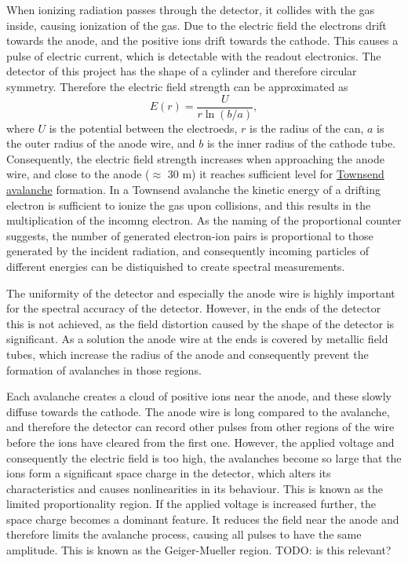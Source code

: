 \documentclass[a4paper]{article}
\begin{document}
When ionizing radiation passes through the detector, it collides with the gas inside, causing ionization of the gas.
Due to the electric field the electrons drift towards the anode, and the positive ions drift towards the cathode.
This causes a pulse of electric current, which is detectable with the readout electronics.
The detector of this project has the shape of a cylinder and therefore circular symmetry.
Therefore the electric field strength can be approximated as
\begin{equation}
E(r) = \frac{U}{r \ln(b/a) },
\end{equation}
where $U$ is the potential between the electroeds, $r$ is the radius of the can, $a$ is the outer radius of the anode wire, and $b$ is the inner radius of the cathode tube.
Consequently, the electric field strength increases when approaching the anode wire, and close to the anode ($\approx$ 30 \textmu m) it reaches sufficient level for
\href{https://en.wikipedia.org/wiki/Townsend_discharge}{Townsend avalanche} formation.
In a Townsend avalanche the kinetic energy of a drifting electron is sufficient to ionize the gas upon collisions, and this results in the multiplication of the incomng electron.
As the naming of the proportional counter suggests, the number of generated electron-ion pairs is proportional to those generated by the incident radiation, and consequently incoming particles of different energies can be distiquished to create spectral measurements.
\cites{winkler_gaseous_2015}[p. 159--164]{knoll_radiation_2010}

The uniformity of the detector and especially the anode wire is highly important for the spectral accuracy of the detector.
However, in the ends of the detector this is not achieved, as the field distortion caused by the shape of the detector is significant.
As a solution the anode wire at the ends is covered by metallic field tubes, which increase the radius of the anode and consequently prevent the formation of avalanches in those regions.
\cite[p. 165]{knoll_radiation_2010}

Each avalanche creates a cloud of positive ions near the anode, and these slowly diffuse towards the cathode.
The anode wire is long compared to the avalanche, and therefore the detector can record other pulses from other regions of the wire before the ions have cleared from the first one.
However, the applied voltage and consequently the electric field is too high, the avalanches become so large that the ions form a significant space charge in the detector, which alters its characteristics and causes nonlinearities in its behaviour.
This is known as the limited proportionality region.
If the applied voltage is increased further, the space charge becomes a dominant feature.
It reduces the field near the anode and therefore limits the avalanche process, causing all pulses to have the same amplitude.
This is known as the Geiger-Mueller region.
TODO: is this relevant?
\cite[p. 160--161]{knoll_radiation_2010}
\end{document}
